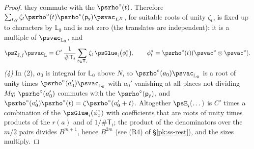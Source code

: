 \documentclass[10pt]{amsart}
\theoremstyle{definition}
\theoremstyle{remark}
\begin{document}
\begin{proof}
they commute with the $\psrho^\circ(t)$. Therefore $\sum_{t,\mathsf y}\zeta_t\psrho^\circ(t)
\psrho^\circ(\mathsf p_{\mathsf y})\psvac_{L^X}$, for suitable roots of unity $\zeta_t$, is fixed up
to characters by $\mathbb L_0$ and is not zero (the translates are independent): it is a multiple
of $\psvac_{\mathbb L_0}$, and
\[
\psZ_{\mathbb J,f}\psvac_{\mathbb L}=C'\,\frac1{\#\mathsf T_i}\sum_{t\in\mathsf T_i}\zeta_t\,
\psGlue_i\bigl(\phi^\circ_t\bigr),\qquad\phi^\circ_t=\psrho^\circ(t)(\psvac^\circ\otimes\psvac^\circ).
\]
\emph{(4)} In (2), $a_0$ is integral for $\mathbb L_0$ above $N$, so $\psrho^\circ(a_0)
\psvac_{\mathbb L_0}$ is a root of unity times $\psrho^\circ(a_0')\psvac_{\mathbb L_0}$ with $a_0'$
vanishing at all places not dividing $Mq$; $\psrho^\circ(a_0')$ commutes with the
$\psrho^\circ(\mathsf p_{\mathsf y})$, and $\psrho^\circ(a'_0)\psrho^\circ(t)=\zeta\psrho^\circ
(a_0'+t)$. Altogether $\psE_i(\dots)$ is $C'$ times a combination of the $\psGlue_i(\phi^\circ_x)$
with coefficients that are roots of unity times products of the $r(a)$ and of $1/\#\mathsf T_i$;
the product of the denominators over the $m/2$ pairs divides $B^{m+1}$, hence $B^{2m}$ (see (R4)
of \S\ref{pk:ss-rest}), and the sizes multiply.
\end{proof}
\end{document}
